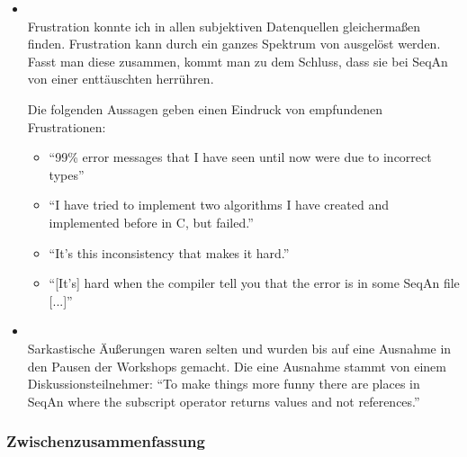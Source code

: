\begin{itemize}
\begin{itemize}
    \item[\codebullet{apiua://code/-9223372036854775314}] \textbf{} \\
    Frustration konnte ich in allen subjektiven Datenquellen gleichermaßen finden. Frustration kann durch ein ganzes Spektrum von  ausgelöst werden. Fasst man diese zusammen, kommt man zu dem Schluss, dass sie bei SeqAn von einer enttäuschten  herrühren.
    
    Die folgenden Aussagen geben einen Eindruck von empfundenen Frustrationen:    
    \begin{itemize}
      \item ``99\% error messages that I have seen until now were due to incorrect types''
      \item ``I have tried to implement two algorithms I have created and implemented before in C, but failed.''
      \item ``It's this inconsistency that makes it hard.''
      \item ``[It's] hard when the compiler tell you that the error is in some SeqAn file [...]''
    \end{itemize}
    
    \item[\codebullet{apiua://code/-9223372036854775115}] \textbf{} \\
    Sarkastische Äußerungen waren selten und wurden bis auf eine Ausnahme in den Pausen der Workshops gemacht. Die eine Ausnahme stammt von einem Diskussionsteilnehmer: ``To make things more funny there are places in SeqAn where the subscript operator returns values and not references.''
  \end{itemize}
\end{itemize}

\subsubsection{Zwischenzusammenfassung}

